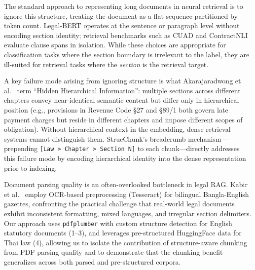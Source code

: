 \documentclass[sn-mathphys,Numbered]{sn-jnl}%
\begin{document}
The standard approach to representing long documents in neural retrieval
is to ignore this structure, treating the document as a flat sequence
partitioned by token count.  Legal-BERT \cite{chalkidis-etal-2020-legal}
operates at the sentence or paragraph level without encoding section
identity; retrieval benchmarks such as CUAD \cite{hendrycks2021cuadexpertannotatednlpdataset}
and ContractNLI evaluate clause spans in isolation.  While these choices
are appropriate for classification tasks where the section boundary is
irrelevant to the label, they are ill-suited for retrieval tasks where
the \emph{section} is the retrieval target.

A key failure mode arising from ignoring structure is what
Akarajaradwong et al.~\cite{akarajaradwong2025nitibenchcomprehensivestudyllm} term ``Hidden Hierarchical
Information'': multiple sections across different chapters convey
near-identical semantic content but differ only in hierarchical position
(e.g., provisions in Revenue Code \S27 and \S89/1 both govern late
payment charges but reside in different chapters and impose different
scopes of obligation).  Without hierarchical context in the embedding,
dense retrieval systems cannot distinguish them.  StrucChunk's breadcrumb
mechanism---prepending \texttt{[Law > Chapter > Section N]} to each
chunk---directly addresses this failure mode by encoding hierarchical
identity into the dense representation prior to indexing.

Document parsing quality is an often-overlooked bottleneck in legal RAG.
Kabir et al.~\cite{kabir2025legalraghybridragmultilingual} employ OCR-based preprocessing (Tesseract) for
bilingual Bangla-English gazettes, confronting the practical challenge
that real-world legal documents exhibit inconsistent formatting, mixed
languages, and irregular section delimiters.  Our approach uses
\texttt{pdfplumber} with custom structure detection for English statutory
documents (1--3), and leverages pre-structured HuggingFace data
for Thai law (4), allowing us to isolate the contribution of
structure-aware chunking from PDF parsing quality and to demonstrate that
the chunking benefit generalizes across both parsed and pre-structured
corpora.
\end{document}
